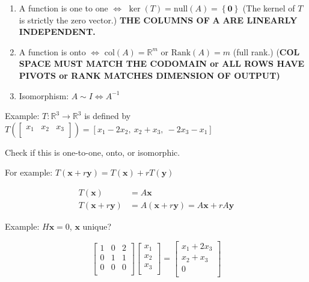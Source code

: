 \documentclass[12pt]{article}
\theoremstyle{plain}
\theoremstyle{remark}
\theoremstyle{definition}
\begin{document}
\begin{framed}

\begin{enumerate}
\def\labelenumi{\arabic{enumi}.}
\item
  A function is one to one \(\Leftrightarrow\)
  \(\ker(T) = \text{null}(A) = \left\{ \mathbf{0} \right\}\) (The
  kernel of \(T\) is strictly the zero vector.) \textbf{THE COLUMNS OF}
  \(\mathbf{A}\) \textbf{ARE LINEARLY INDEPENDENT.}
\item
  A function is onto \(\Leftrightarrow\)
  \(\text{col}(A) = \mathbb{R}^{m}\) or \(\text{Rank}{(A)} = m\) (full
  rank.) (\textbf{COL SPACE MUST MATCH THE CODOMAIN or ALL ROWS HAVE
  PIVOTS or RANK MATCHES DIMENSION OF OUTPUT)}
\item
  Isomorphism: \(A\sim I \Leftrightarrow A^{- 1}\)
\end{enumerate}

\end{framed}



Example: \(T:\mathbb{R}^{3} \rightarrow \mathbb{R}^{3}\) is defined by
\(T\left( \begin{bmatrix}
x_{1} & x_{2} & x_{3} \\
\end{bmatrix} \right) = \left\lbrack x_{1} - 2x_{2},\ x_{2} + x_{3},\  - 2x_{3} - x_{1} \right\rbrack\)

Check if this is one-to-one, onto, or isomorphic.

For example:
\(T\left( \mathbf{x} + r\mathbf{y} \right) = T\left( \mathbf{x} \right) + rT\left( \mathbf{y} \right)\)

\begin{align*}
T\left( \mathbf{x} \right) &= A\mathbf{x} \\
T\left( \mathbf{x} + r\mathbf{y} \right) &= A\left( \mathbf{x} + r\mathbf{y} \right) = A\mathbf{x} + rA\mathbf{y}
\end{align*}


Example: \(H\mathbf{x} = 0\), \(\mathbf{x}\) unique?

\[\begin{bmatrix}
1 & 0 & 2 \\
0 & 1 & 1 \\
0 & 0 & 0 \\
\end{bmatrix}\begin{bmatrix}
x_{1} \\
x_{2} \\
x_{3} \\
\end{bmatrix} = \begin{bmatrix}
x_{1} + 2x_{3} \\
x_{2} + x_{3} \\
0 \\
\end{bmatrix}\]
\end{document}
